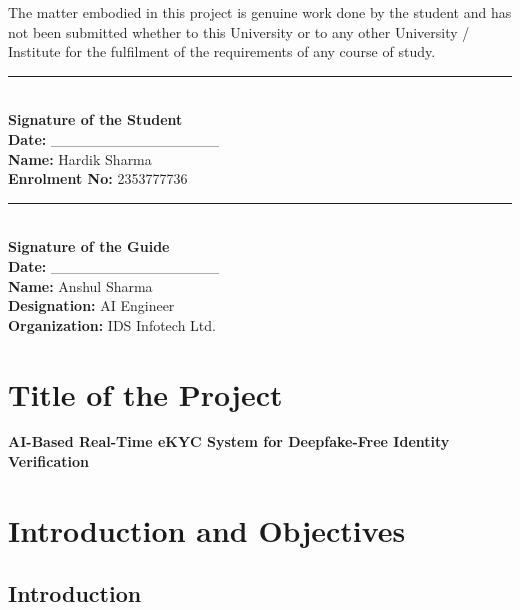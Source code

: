 \documentclass[12pt,a4paper]{article}
\begin{document}
\vspace{0.8cm}

The matter embodied in this project is genuine work done by the student and has not been submitted whether to this University or to any other University / Institute for the fulfilment of the requirements of any course of study.

\vspace{2cm}

\begin{minipage}[t]{0.45\textwidth}
    \rule{6cm}{0.5pt}\\
    \textbf{Signature of the Student}\\[0.2cm]
    \textbf{Date:} \_\_\_\_\_\_\_\_\_\_\_\_\_\_\_\_\\[0.3cm]
    
    \textbf{Name:} Hardik Sharma\\
    \textbf{Enrolment No:} 2353777736
\end{minipage}
\hfill
\begin{minipage}[t]{0.45\textwidth}
    \rule{6cm}{0.5pt}\\
    \textbf{Signature of the Guide}\\[0.2cm]
    \textbf{Date:} \_\_\_\_\_\_\_\_\_\_\_\_\_\_\_\_\\[0.3cm]
    
    \textbf{Name:} Anshul Sharma\\
    \textbf{Designation:} AI Engineer\\
    \textbf{Organization:} IDS Infotech Ltd.
\end{minipage}

\newpage

\tableofcontents
\newpage


\section{Title of the Project}

\textbf{AI-Based Real-Time eKYC System for Deepfake-Free Identity Verification}

\section{Introduction and Objectives}

\subsection{Introduction}
\end{document}
